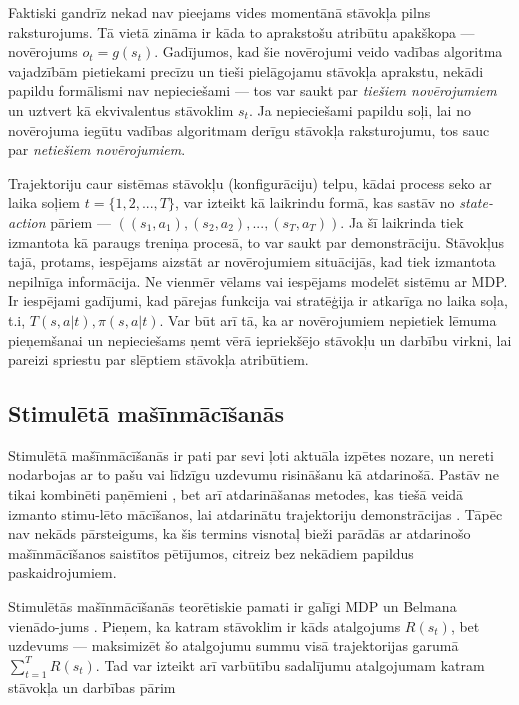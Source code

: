 \documentclass[12pt, a4paper]{article}
\numberwithin{equation}{section} %
\begin{document}
Faktiski gandrīz nekad nav pieejams vides momentānā stāvokļa pilns raksturojums. Tā vietā zināma ir kāda to aprakstošu atribūtu apakškopa --- novērojums $o_t = g(s_t)$. Gadījumos, kad šie novērojumi veido vadības algoritma vajadzībām pietiekami precīzu un tieši pielāgojamu stāvokļa aprakstu, nekādi papildu formālismi nav nepieciešami --- tos var saukt par \textit{tiešiem novērojumiem} un uztvert kā ekvivalentus stāvoklim $s_t$. Ja nepieciešami papildu soļi, lai no novērojuma iegūtu vadības algoritmam derīgu stāvokļa raksturojumu, tos sauc par \textit{netiešiem novērojumiem}.

Trajektoriju caur sistēmas stāvokļu (konfigurāciju) telpu, kādai process seko ar laika soļiem $t = \lbrace 1, 2, ..., T \rbrace$, var izteikt kā laikrindu formā, kas sastāv no \textit{state-action} pāriem --- $((s_1, a_1), (s_2, a_2), ..., (s_T, a_T))$. Ja šī laikrinda tiek izmantota kā paraugs treniņa procesā, to var saukt par demonstrāciju. Stāvokļus tajā, protams, iespējams aizstāt ar novērojumiem situācijās, kad tiek izmantota nepilnīga informācija. Ne vienmēr vēlams vai iespējams modelēt sistēmu ar MDP. Ir iespējami gadījumi, kad pārejas funkcija vai stratēģija ir atkarīga no laika soļa, t.i, $T(s,a \vert t), \pi(s,a \vert t)$. Var būt arī tā, ka ar novērojumiem nepietiek lēmuma pieņemšanai un nepieciešams ņemt vērā iepriekšējo stāvokļu un darbību virkni, lai pareizi spriestu par slēptiem stāvokļa atribūtiem. 

\subsection{Stimulētā mašīnmācīšanās}

Stimulētā mašīnmācīšanās ir pati par sevi ļoti aktuāla izpētes nozare, un nereti nodarbojas ar to pašu vai līdzīgu uzdevumu risināšanu kā atdarinošā. Pastāv ne tikai kombinēti paņēmieni \cite{gupta2019relay, brown2019extrapolating}, bet arī atdarināšanas metodes, kas tiešā veidā izmanto stimu-lēto mācīšanos, lai atdarinātu trajektoriju demonstrācijas \cite{englert2018learning}. Tāpēc nav nekāds pārsteigums, ka šis termins visnotaļ bieži parādās ar atdarinošo mašīnmācīšanos saistītos pētījumos, citreiz bez nekādiem papildus paskaidrojumiem.

Stimulētās mašīnmācīšanās teorētiskie pamati ir galīgi MDP un Belmana vienādo-jums \cite{sutton2018reinforcement}. Pieņem, ka katram stāvoklim ir kāds atalgojums $R(s_t)$, bet uzdevums --- maksimizēt šo atalgojumu summu visā trajektorijas garumā $\sum_{t=1}^T R(s_t)$. Tad var izteikt arī varbūtību sadalījumu atalgojumam katram stāvokļa un darbības pārim
\end{document}
